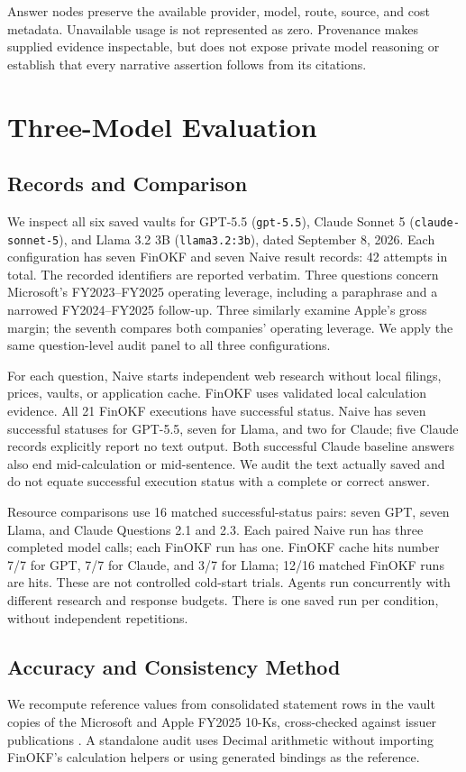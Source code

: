 \documentclass[letterpaper]{article} %
\begin{document}
Answer nodes preserve the available provider, model, route, source, and cost metadata. Unavailable usage is not represented as zero. Provenance makes supplied evidence inspectable, but does not expose private model reasoning or establish that every narrative assertion follows from its citations.

\section{Three-Model Evaluation}
\subsection{Records and Comparison}
We inspect all six saved vaults for GPT-5.5 (\texttt{gpt-5.5}), Claude Sonnet 5 (\texttt{claude-sonnet-5}), and Llama 3.2 3B (\texttt{llama3.2:3b}), dated September 8, 2026. Each configuration has seven FinOKF and seven Naive result records: 42 attempts in total. The recorded identifiers are reported verbatim. Three questions concern Microsoft's FY2023--FY2025 operating leverage, including a paraphrase and a narrowed FY2024--FY2025 follow-up. Three similarly examine Apple's gross margin; the seventh compares both companies' operating leverage. We apply the same question-level audit panel to all three configurations.

For each question, Naive starts independent web research without local filings, prices, vaults, or application cache. FinOKF uses validated local calculation evidence. All 21 FinOKF executions have successful status. Naive has seven successful statuses for GPT-5.5, seven for Llama, and two for Claude; five Claude records explicitly report no text output. Both successful Claude baseline answers also end mid-calculation or mid-sentence. We audit the text actually saved and do not equate successful execution status with a complete or correct answer.

Resource comparisons use 16 matched successful-status pairs: seven GPT, seven Llama, and Claude Questions 2.1 and 2.3. Each paired Naive run has three completed model calls; each FinOKF run has one. FinOKF cache hits number 7/7 for GPT, 7/7 for Claude, and 3/7 for Llama; 12/16 matched FinOKF runs are hits. These are not controlled cold-start trials. Agents run concurrently with different research and response budgets. There is one saved run per condition, without independent repetitions.

\subsection{Accuracy and Consistency Method}
We recompute reference values from consolidated statement rows in the vault copies of the Microsoft and Apple FY2025 10-Ks, cross-checked against issuer publications \citep{msft2025report,apple2025results,apple2024results}. A standalone audit uses Decimal arithmetic without importing FinOKF's calculation helpers or using generated bindings as the reference.
\end{document}
